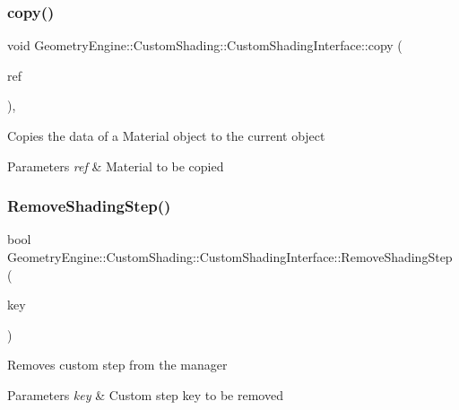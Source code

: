 \subsubsection{\texorpdfstring{copy()}{copy()}}
{\footnotesize\ttfamily void Geometry\+Engine\+::\+Custom\+Shading\+::\+Custom\+Shading\+Interface\+::copy (\begin{DoxyParamCaption}\item[{const \mbox{\hyperlink{class_geometry_engine_1_1_custom_shading_1_1_custom_shading_interface}{Custom\+Shading\+Interface}} \&}]{ref }\end{DoxyParamCaption})\hspace{0.3cm}{\ttfamily [protected]}, {\ttfamily [virtual]}}

Copies the data of a Material object to the current object 
\begin{DoxyParams}{Parameters}
{\em ref} & Material to be copied \\
\hline
\end{DoxyParams}
\mbox{\label{class_geometry_engine_1_1_custom_shading_1_1_custom_shading_interface_ae5f0bbc37cd6333fd389acabb2723c34}} 
\subsubsection{\texorpdfstring{RemoveShadingStep()}{RemoveShadingStep()}}
{\footnotesize\ttfamily bool Geometry\+Engine\+::\+Custom\+Shading\+::\+Custom\+Shading\+Interface\+::\+Remove\+Shading\+Step (\begin{DoxyParamCaption}\item[{\mbox{\hyperlink{namespace_geometry_engine_1_1_custom_shading_a2dc236a5b567da5099069ce2b2be5609}{Custom\+Shading\+Steps}}}]{key }\end{DoxyParamCaption})}

Removes custom step from the manager 
\begin{DoxyParams}{Parameters}
{\em key} & Custom step key to be removed \\
\hline
\end{DoxyParams}
\mbox{\label{class_geometry_engine_1_1_custom_shading_1_1_custom_shading_interface_a78a7ebc766069eb80ee641b5765445dd}} 
